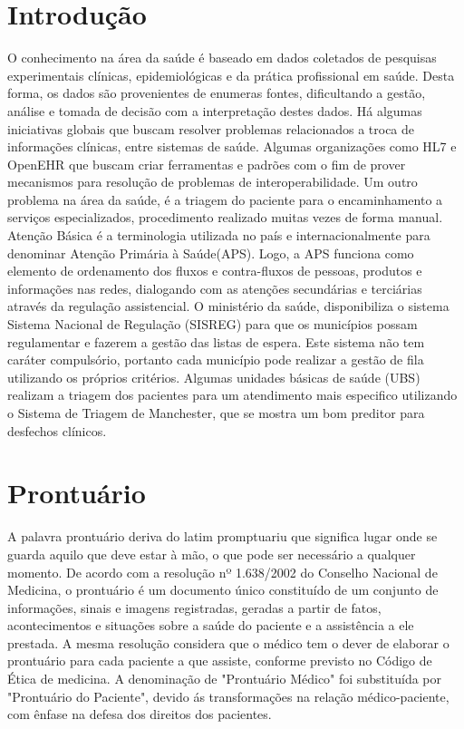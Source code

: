 \section{Introdução}

O conhecimento na área da saúde é baseado em dados coletados de pesquisas experimentais clínicas, epidemiológicas e da prática profissional em saúde. Desta forma, os dados são provenientes de enumeras fontes, dificultando a gestão, análise e tomada de decisão com a interpretação destes dados. Há algumas iniciativas globais que buscam resolver problemas relacionados a troca de informações clínicas, entre sistemas de saúde. Algumas organizações como HL7 e OpenEHR que buscam criar ferramentas e padrões com o fim de prover mecanismos para resolução de problemas de interoperabilidade. Um outro problema na área da saúde, é a triagem do paciente para o encaminhamento a serviços especializados, procedimento realizado muitas vezes de forma manual. Atenção Básica é a terminologia utilizada no país e internacionalmente para denominar Atenção Primária à Saúde(APS). Logo, a APS funciona como elemento de ordenamento dos fluxos e contra-fluxos de pessoas, produtos e informações nas redes, dialogando com as atenções secundárias e terciárias através da regulação assistencial.\cite{Nayara}
O ministério da saúde, disponibiliza o sistema Sistema Nacional de Regulação (SISREG) para que os municípios possam regulamentar e fazerem a  gestão das listas de espera. Este sistema não tem caráter compulsório, portanto cada município pode realizar a gestão de fila utilizando os próprios critérios.\cite{SISREG} Algumas unidades básicas de saúde (UBS) realizam a triagem dos pacientes para um atendimento mais especifico utilizando o Sistema de Triagem de Manchester, que se mostra um bom preditor para desfechos clínicos. \cite{TRIAGEMAVALICAO} 


\section{Prontuário }

A palavra prontuário deriva do latim promptuariu que significa lugar onde se guarda aquilo que deve estar à mão, o que pode ser necessário a qualquer momento\cite{PATRICIO}. De acordo com a resolução nº 1.638/2002 do Conselho Nacional de Medicina, o prontuário é um documento único constituído de um conjunto de informações, sinais e imagens registradas, geradas a partir de fatos, acontecimentos e situações sobre a saúde do paciente e a assistência a ele prestada. A mesma resolução considera que o médico tem o dever de elaborar o prontuário para cada paciente a que assiste, conforme previsto no Código de Ética de medicina. A denominação de "Prontuário Médico" foi substituída por "Prontuário do Paciente", devido ás transformações na relação médico-paciente, com ênfase na defesa dos direitos dos pacientes.\cite{PATRICIO} 

